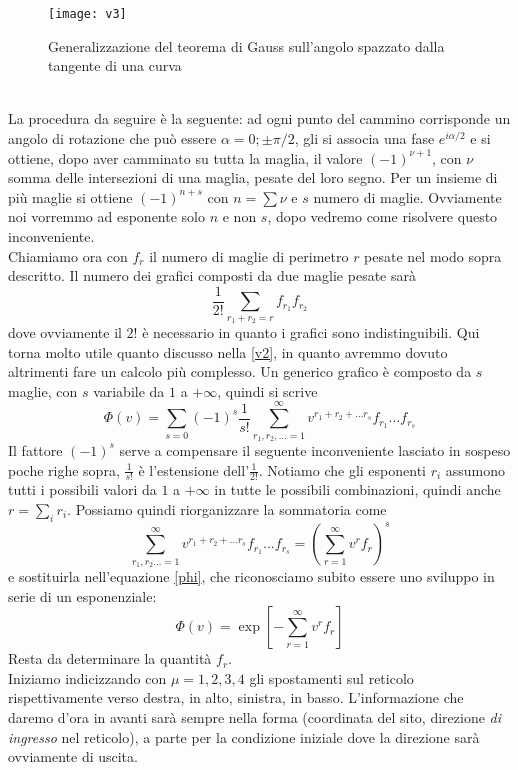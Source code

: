 \documentclass[11pt]{article}
\begin{document}
\begin{figure}[h]
\centering
\texttt{[image: v3]}
\caption{Generalizzazione del teorema di Gauss sull'angolo spazzato dalla tangente di una curva}
\label{v3}
\end{figure}
\\ La procedura da seguire è la seguente: ad ogni punto del cammino corrisponde un angolo di rotazione che può essere $\alpha=0;\pm\pi/2$, gli si associa una fase $e^{i\alpha/2}$ e si ottiene, dopo aver camminato su tutta la maglia, il valore $(-1)^{\nu+1}$, con $\nu$ somma delle intersezioni di una maglia, pesate del loro segno. Per un insieme di più maglie si ottiene $(-1)^{n+s}$ con $n=\sum\nu$ e $s$ numero di maglie. Ovviamente noi vorremmo ad esponente solo $n$ e non $s$, dopo vedremo come risolvere questo inconveniente.\\
Chiamiamo ora con $f_r$ il numero di maglie di perimetro $r$ pesate nel modo sopra descritto. Il numero dei grafici composti da due maglie pesate sarà
$$\frac{1}{2!}\sum_{r_1+r_2=r}f_{r_1}f_{r_2}$$
dove ovviamente il $2!$ è necessario in quanto i grafici sono indistinguibili. Qui torna molto utile quanto discusso nella \ref{v2}, in quanto avremmo dovuto altrimenti fare un calcolo più complesso. Un generico grafico è composto da $s$ maglie, con $s$ variabile da $1$ a $+\infty$, quindi si scrive
\begin{equation} \label{phi}
\Phi(v)=\sum_{s=0}(-1)^s\frac{1}{s!}\sum_{r_1,r_2,...=1}^\infty v^{r_1+r_2+...r_s}f_{r_1}...f_{r_s}
\end{equation}
Il fattore $(-1)^s$ serve a compensare il seguente inconveniente lasciato in sospeso poche righe sopra, $\frac{1}{s!}$ è l'estensione dell'$\frac{1}{2!}$. Notiamo che gli esponenti $r_i$ assumono tutti i possibili valori da $1$ a $+\infty$ in tutte le possibili combinazioni, quindi anche $r=\sum_i r_i$. Possiamo quindi riorganizzare la sommatoria come
$$\sum_{r_1,r_2...=1}^\infty v^{r_1+r_2+...r_s}f_{r_1}...f_{r_s}=\left( \sum_{r=1}^\infty v^rf_r \right)^s$$
e sostituirla nell'equazione \ref{phi}, che riconosciamo subito essere uno sviluppo in serie di un esponenziale:
\begin{equation}\label{phi2}
 \Phi(v)= \exp \left[ - \sum_{r=1}^\infty v^r f_r \right]
\end{equation}
Resta da determinare la quantità $f_r$.\\
Iniziamo indicizzando con $\mu=1,2,3,4$ gli spostamenti sul reticolo rispettivamente verso destra, in alto, sinistra, in basso. L'informazione che daremo d'ora in avanti sarà sempre nella forma (coordinata del sito, direzione \emph{di ingresso} nel reticolo), a parte per la condizione iniziale dove la direzione sarà ovviamente di uscita. \\
\end{document}
